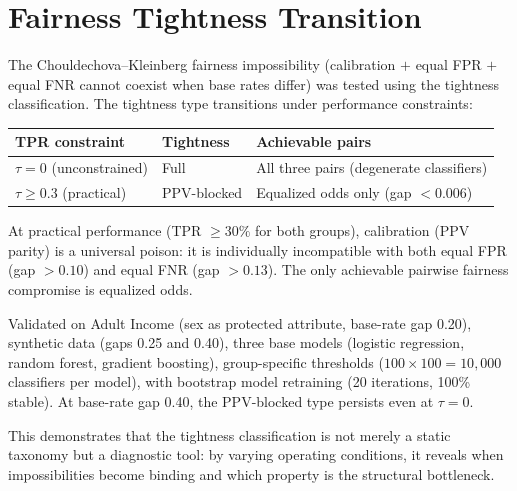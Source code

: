 \documentclass[11pt]{article}
\begin{document}
\section{Fairness Tightness Transition}
\label{sec:fairness-tightness}

The Chouldechova--Kleinberg fairness impossibility (calibration $+$ equal FPR $+$ equal FNR cannot coexist when base rates differ) was tested using the tightness classification.  The tightness type transitions under performance constraints:

\begin{center}
\small
\begin{tabular}{lll}
\toprule
TPR constraint & Tightness & Achievable pairs \\
\midrule
$\tau = 0$ (unconstrained) & Full & All three pairs (degenerate classifiers) \\
$\tau \geq 0.3$ (practical) & PPV-blocked & Equalized odds only (gap $< 0.006$) \\
\bottomrule
\end{tabular}
\end{center}

At practical performance (TPR $\geq 30\%$ for both groups), calibration (PPV parity) is a universal poison: it is individually incompatible with both equal FPR (gap $> 0.10$) and equal FNR (gap $> 0.13$).  The only achievable pairwise fairness compromise is equalized odds.

Validated on Adult Income (sex as protected attribute, base-rate gap 0.20), synthetic data (gaps 0.25 and 0.40), three base models (logistic regression, random forest, gradient boosting), group-specific thresholds ($100 \times 100 = 10{,}000$ classifiers per model), with bootstrap model retraining (20 iterations, 100\% stable).  At base-rate gap 0.40, the PPV-blocked type persists even at $\tau = 0$.

This demonstrates that the tightness classification is not merely a static taxonomy but a diagnostic tool: by varying operating conditions, it reveals when impossibilities become binding and which property is the structural bottleneck.



\end{document}
